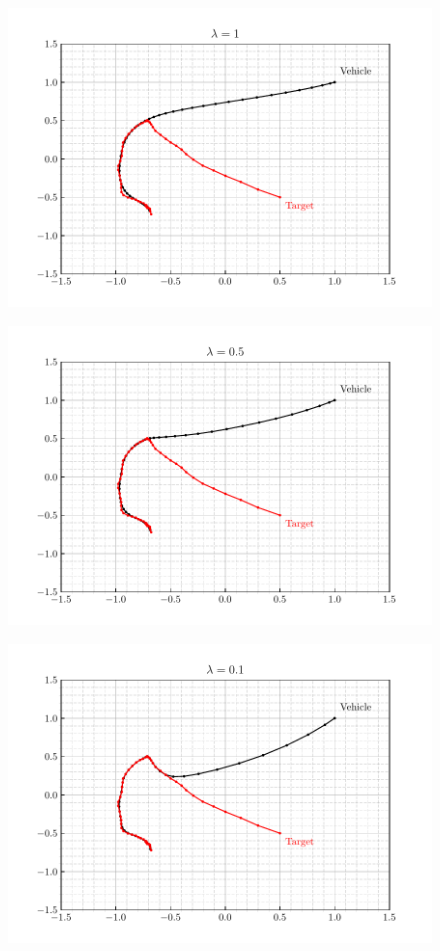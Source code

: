 \documentclass[12pt]{article}
\begin{document}
\begin{figure}[H]
    \centering
    \includegraphics{../../src/task_1/output/ex_1_i=3.pdf}
\end{figure}

\begin{figure}[H]
    \centering
    \includegraphics{../../src/task_1/output/ex_1_i=4.pdf}
\end{figure}

\begin{figure}[H]
    \centering
    \includegraphics{../../src/task_1/output/ex_1_i=5.pdf}
\end{figure}
\end{document}
